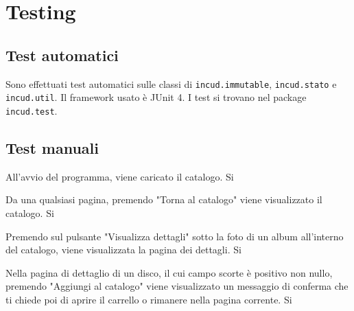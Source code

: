 \chapter{Testing}

\section{Test automatici}

Sono effettuati test automatici  sulle classi di \texttt{incud.immutable}, \texttt{incud.stato} e \texttt{incud.util}. Il framework usato è JUnit 4. I test si trovano nel package \texttt{incud.test}.

\section{Test manuali}

\newlength{\testdesc}
\setlength{\testdesc}{\textwidth-4cm}

\NewDocumentCommand{}

    {All'avvio del programma, viene caricato il catalogo.}
    {Si}

    {Da una qualsiasi pagina, premendo "Torna al catalogo" viene visualizzato il catalogo.}
    {Si}

    {Premendo sul pulsante "Visualizza dettagli" sotto la foto di un album all'interno del catalogo, viene visualizzata la pagina dei dettagli.}
    {Si}

    {Nella pagina di dettaglio di un disco, il cui campo scorte è positivo non nullo, premendo "Aggiungi al catalogo" viene visualizzato un messaggio di conferma che ti chiede poi di aprire il carrello o rimanere nella pagina corrente.}
    {Si}

